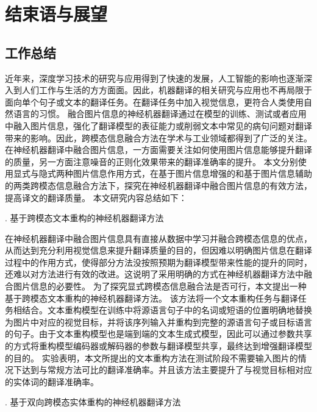 \chapter{结束语与展望}

\section{工作总结}
近年来，深度学习技术的研究与应用得到了快速的发展，人工智能的影响也逐渐深入到人们工作与生活的方方面面。因此，机器翻译的相关研究与应用也不再局限于面向单个句子或文本的翻译任务。在翻译任务中加入视觉信息，更符合人类使用自然语言的习惯。
融合图片信息的神经机器翻译通过在模型的训练、测试或者应用中融入图片信息，强化了翻译模型的表征能力或削弱文本中常见的病句问题对翻译带来的影响。因此，跨模态信息融合方法在学术与工业领域都得到了广泛的关注。
在神经机器翻译中融合图片信息，一方面需要关注如何使用图片信息能够提升翻译的质量，另一方面注意噪音的正则化效果带来的翻译准确率的提升。
本文分别使用显式与隐式两种图片信息作用方式，在基于图片信息增强的和基于图片信息辅助的两类跨模态信息融合方法下，探究在神经机器翻译中融合图片信息的有效方法，提高译文的翻译质量。
本文研究内容总结如下：

{. 基于跨模态文本重构的神经机器翻译方法}

在神经机器翻译中融合图片信息具有直接从数据中学习并融合跨模态信息的优点，从而达到充分利用视觉信息来提升翻译质量的目的，但因难以明确图片信息在翻译过程中的作用方式，使得部分方法没按照预期为翻译模型带来性能的提升的同时，还难以对方法进行有效的改进。这说明了采用明确的方式在神经机器翻译方法中融合图片信息的必要性。
为了探究显式跨模态信息融合法是否可行，本文提出一种基于跨模态文本重构的神经机器翻译方法。
该方法将一个文本重构任务与翻译任务相结合。文本重构模型在训练中将源语言句子中的名词或短语的位置明确地替换为图片中对应的视觉目标，并将该序列输入并重构到完整的源语言句子或目标语言的句子。由于文本重构模型也是端到端的文本生成式模型，因此可以通过参数共享的方式将重构模型编码器或解码器的参数与翻译模型共享，最终达到增强翻译模型的目的。
实验表明，本文所提出的文本重构方法在测试阶段不需要输入图片的情况下达到与常规方法可比的翻译准确率。并且该方法主要提升了与视觉目标相对应的实体词的翻译准确率。

{. 基于双向跨模态实体重构的神经机器翻译方法}

